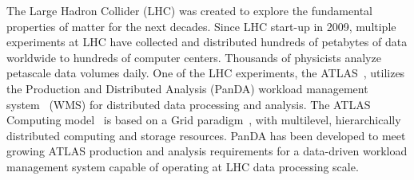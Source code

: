 The Large Hadron Collider (LHC) was created to explore the fundamental
properties of matter for the next decades.  Since LHC start-up in 2009, multiple
experiments  at LHC have collected and distributed hundreds of petabytes of data
worldwide to hundreds of computer centers. Thousands of physicists analyze
petascale data volumes daily. One of the LHC experiments, the
ATLAS~\cite{Aad:2008}, utilizes the Production and Distributed Analysis (PanDA)
workload management system~\cite{Maeno2011} (WMS) for distributed data
processing and analysis. The ATLAS Computing model~\cite{jones2008atlas} is
based on a Grid paradigm~\cite{foster2003grid}, with multilevel, hierarchically
distributed computing and storage resources. PanDA has been developed to meet
growing ATLAS production and analysis requirements for a data-driven workload
management system capable of operating at LHC data processing scale.





